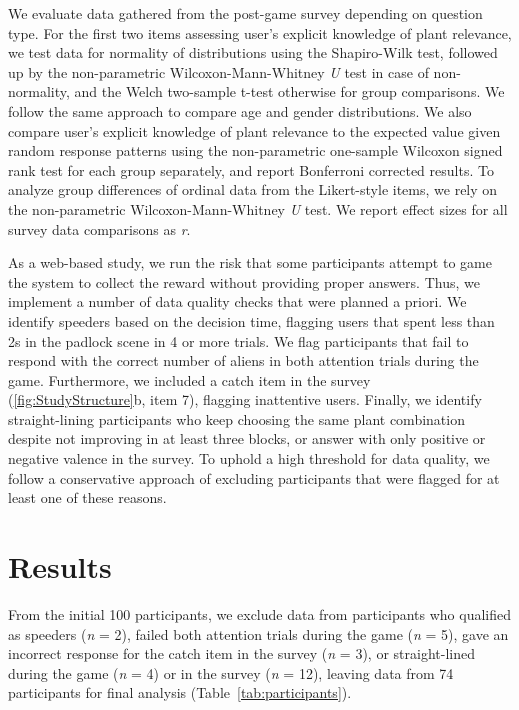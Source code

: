 We evaluate data gathered from the post-game survey depending on question type.
For the first two items assessing user's explicit knowledge of plant relevance, we test data for normality of distributions using the Shapiro-Wilk test, followed up by the non-parametric Wilcoxon-Mann-Whitney \textit{U} test in case of non-normality, and the Welch two-sample t-test otherwise for group comparisons. 
We follow the same approach to compare age and gender distributions.
We also compare user's explicit knowledge of plant relevance to the expected value given random response patterns using the non-parametric one-sample Wilcoxon signed rank test for each group separately, and report Bonferroni corrected results.
To analyze group differences of ordinal data from the Likert-style items, we rely on the non-parametric Wilcoxon-Mann-Whitney \textit{U} test.
We report effect sizes for all survey data comparisons as \textit{r}.

As a web-based study, we run the risk that some participants attempt to game the system to collect the reward without providing proper answers. 
Thus, we implement a number of data quality checks that were planned a priori.
We identify speeders based on the decision time, flagging users that spent less than 2s in the padlock scene in 4 or more trials.
We flag participants that fail to respond with the correct number of aliens in both attention trials during the game.
Furthermore, we included a catch item in the survey (\ref{fig:StudyStructure}b, item 7), flagging inattentive users.
Finally, we identify straight-lining participants who keep choosing the same plant combination despite not improving in at least three blocks, or answer with only positive or negative valence in the survey.
To uphold a high threshold for data quality, we follow a conservative approach of excluding participants that were flagged for at least one of these reasons.

\section{Results}\label{sec:results}

From the initial 100 participants, we exclude data from participants who qualified as speeders (\textit{n} = 2), failed both attention trials during the game (\textit{n} = 5), gave an incorrect response for the catch item in the survey (\textit{n} = 3), or straight-lined during the game (\textit{n} = 4) or in the survey (\textit{n} = 12), leaving data from 74 participants for final analysis (Table~\ref{tab:participants}).

